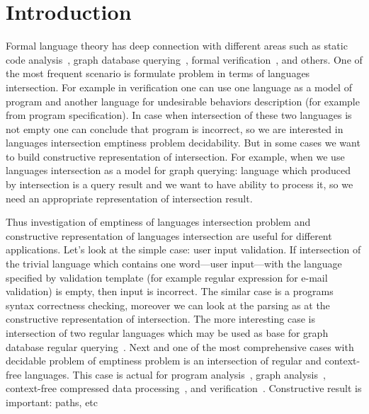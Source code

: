 \section{Introduction}

Formal language theory has deep connection with different areas such as static code analysis~\cite{Reps:1995:PID:199448.199462,vardoulakis2010cfa2,Yan:2011:DCA:2001420.2001440,rehof2001type, lu2013incremental, pratikakis2006existential, zhang2017context}, graph database querying~\cite{hellingsRelational, hellingsPathQuerying,zhang2016context, koschmieder2012regular}, formal verification~\cite{!!!}, and others.
One of the most frequent scenario is formulate problem in terms of languages intersection.
For example in verification one can use one language as a model of program and another language for undesirable behaviors description (for example from program specification).
In case when intersection of these two languages is not empty one can conclude that program is incorrect, so we are interested in languages intersection emptiness problem decidability.
But in some cases we want to build constructive representation of intersection. 
For example, when we use languages intersection as a model for graph querying: language which produced by intersection is a query result and we want to have ability to process it, so we need an appropriate representation of intersection result.

Thus investigation of emptiness of languages intersection problem and constructive representation of languages intersection are useful for different applications.
Let's look at the simple case: user input validation. 
If intersection of the trivial language which contains one word---user input---with the language specified by validation template (for example regular expression for e-mail validation) is empty, then input is incorrect. 
The similar case is a programs syntax correctness checking, moreover we can look at the parsing as at the constructive representation of intersection.
The more interesting case is intersection of two regular languages which may be used as base for graph database regular querying~\cite{ABITEBOUL1999428,koschmieder2012regular,alkhateeb:tel-00293206}.
Next and one of the most comprehensive cases with decidable problem of emptiness problem is an intersection of regular and context-free languages.
This case is actual for program analysis~\cite{!!!}, graph analysis~\cite{!!!}, context-free compressed data processing~\cite{!!!}, and verification~\cite{!!!}.
Constructive result is important: paths, etc

